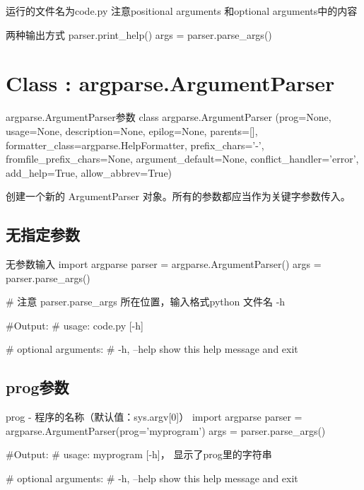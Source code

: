 \documentclass[11pt]{article}
\begin{document}
	运行的文件名为code.py
	注意positional arguments 和optional arguments中的内容
	
	\begin{Python}{两种输出方式}
		parser.print_help()
		args = parser.parse_args()
	\end{Python}

\section{Class : argparse.ArgumentParser }
	\begin{Python}{argparse.ArgumentParser参数}
		class argparse.ArgumentParser
		   (prog=None,
		   usage=None,
		   description=None,
		   epilog=None,
		   parents=[],
		   formatter_class=argparse.HelpFormatter,
		   prefix_chars='-',
		   fromfile_prefix_chars=None,
		   argument_default=None,
		   conflict_handler='error',
		   add_help=True,
		   allow_abbrev=True)
	\end{Python}
	
	创建一个新的 ArgumentParser 对象。所有的参数都应当作为关键字参数传入。   
	
\subsection{无指定参数}
	\begin{Python}{无参数输入}
import argparse
parser = argparse.ArgumentParser()
args = parser.parse_args()
		
#  注意 parser.parse_args 所在位置，输入格式python 文件名 -h
	 
#Output:  
#		 usage: code.py [-h]

#        optional arguments:
#          -h, --help  show this help message and exit
     \end{Python}
 
\subsection{prog参数} 	
 	\begin{Python}{prog - 程序的名称（默认值：sys.argv[0]）}
import argparse
parser = argparse.ArgumentParser(prog='myprogram')
args = parser.parse_args()
 		
#Output:   
#		usage: myprogram [-h]，         显示了prog里的字符串
 		
#       optional arguments:
#         -h, --help  show this help message and exit
 	\end{Python} 
 
\end{document}
